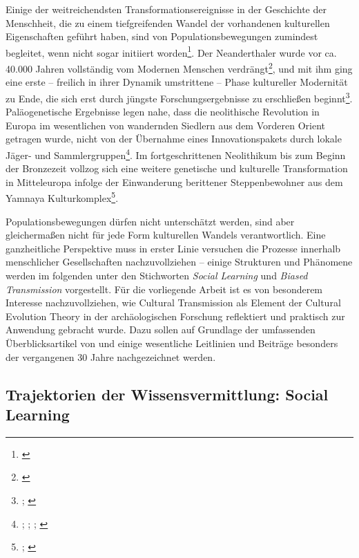 \documentclass[openany,twoside,twocolumn]{book}
\let\rmarkdownfootnote\footnote%
\def\footnote{\protect\rmarkdownfootnote}
\begin{document}
Einige der weitreichendsten Transformationsereignisse in der Geschichte
der Menschheit, die zu einem tiefgreifenden Wandel der vorhandenen
kulturellen Eigenschaften geführt haben, sind von Populationsbewegungen
zumindest begleitet, wenn nicht sogar initiiert worden\footnote{\textcite{boyd_voting_2009}}.
Der Neanderthaler wurde vor ca. 40.000 Jahren vollständig vom Modernen
Menschen verdrängt\footnote{\textcite{skoglund_origins_2012}}, und mit
ihm ging eine erste -- freilich in ihrer Dynamik umstrittene -- Phase
kultureller Modernität zu Ende, die sich erst durch jüngste
Forschungsergebnisse zu erschließen beginnt\footnote{\textcite{hoffmann_symbolic_2018};
  \textcite{tuniz_did_2012}}. Paläogenetische Ergebnisse legen nahe,
dass die neolithische Revolution in Europa im wesentlichen von
wandernden Siedlern aus dem Vorderen Orient getragen wurde, nicht von
der Übernahme eines Innovationspakets durch lokale Jäger- und
Sammlergruppen\footnote{\textcite{aoki_travelling_1996};
  \textcite{bar-yosef_nature_1998}; \textcite{patterson_modelling_2010};
  \textcite{skoglund_origins_2012}}. Im fortgeschrittenen Neolithikum
bis zum Beginn der Bronzezeit vollzog sich eine weitere genetische und
kulturelle Transformation in Mitteleuropa infolge der Einwanderung
berittener Steppenbewohner aus dem Yamnaya Kulturkomplex\footnote{\textcite{allentoft_population_2015};
  \textcite{goldberg_ancient_2017}}.

Populationsbewegungen dürfen nicht unterschätzt werden, sind aber
gleichermaßen nicht für jede Form kulturellen Wandels verantwortlich.
Eine ganzheitliche Perspektive muss in erster Linie versuchen die
Prozesse innerhalb menschlicher Gesellschaften nachzuvollziehen --
einige Strukturen und Phänomene werden im folgenden unter den
Stichworten \emph{Social Learning} und \emph{Biased Transmission}
vorgestellt. Für die vorliegende Arbeit ist es von besonderem Interesse
nachzuvollziehen, wie Cultural Transmission als Element der Cultural
Evolution Theory in der archäologischen Forschung reflektiert und
praktisch zur Anwendung gebracht wurde. Dazu sollen auf Grundlage der
umfassenden Überblicksartikel von \textcite{eerkens_cultural_2007} und
\textcite{garvey_current_2018-1} einige wesentliche Leitlinien und
Beiträge besonders der vergangenen 30 Jahre nachgezeichnet werden.

\hypertarget{social-learning}{%
\subsection{Trajektorien der Wissensvermittlung: Social
Learning}\label{social-learning}}
\end{document}
